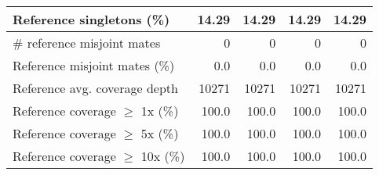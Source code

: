 \documentclass[12pt,a4paper]{article}
\begin{document}
\begin{table}[ht]
\begin{center}
\begin{tabular}{|l*{4}{|r}|}
Reference singletons (\%) & 14.29 & 14.29 & 14.29 & 14.29 \\ \hline
\# reference misjoint mates & 0 & 0 & 0 & 0 \\ \hline
Reference misjoint mates (\%) & 0.0 & 0.0 & 0.0 & 0.0 \\ \hline
Reference avg. coverage depth & 10271 & 10271 & 10271 & 10271 \\ \hline
Reference coverage $\geq$ 1x (\%) & 100.0 & 100.0 & 100.0 & 100.0 \\ \hline
Reference coverage $\geq$ 5x (\%) & 100.0 & 100.0 & 100.0 & 100.0 \\ \hline
Reference coverage $\geq$ 10x (\%) & 100.0 & 100.0 & 100.0 & 100.0 \\ \hline
\end{tabular}
\end{center}
\end{table}
\end{document}
